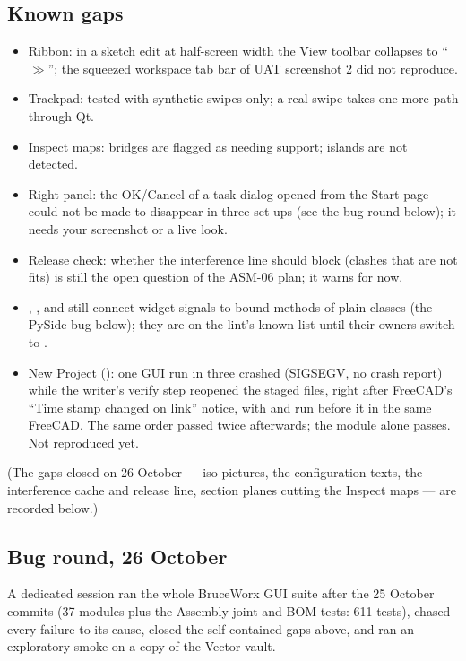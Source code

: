 \subsection{Known gaps}
\begin{itemize}
  \item Ribbon: in a sketch edit at half-screen width the View toolbar collapses to ``$\gg$''; the squeezed
        workspace tab bar of UAT screenshot 2 did not reproduce.
  \item Trackpad: tested with synthetic swipes only; a real swipe takes one more path through Qt.
  \item Inspect maps: bridges are flagged as needing support; islands are not detected.
  \item Right panel: the OK/Cancel of a task dialog opened from the Start page could not be made to disappear
        in three set-ups (see the bug round below); it needs your screenshot or a live look.
  \item Release check: whether the interference line should block (clashes that are not fits) is still the open
        question of the ASM-06 plan; it warns for now.
  \item {}, ,  and
         still connect widget signals to bound methods of plain classes (the PySide
        bug below); they are on the lint's known list until their owners switch to .
  \item New Project (): one GUI run in three crashed (SIGSEGV, no crash report) while the writer's
        verify step reopened the staged files, right after FreeCAD's ``Time stamp changed on link'' notice, with
         and  run before it in the same FreeCAD. The same
        order passed twice afterwards; the module alone passes. Not reproduced yet.
\end{itemize}
(The gaps closed on 26 October --- iso pictures, the configuration texts, the interference cache and release
line, section planes cutting the Inspect maps --- are recorded below.)

\subsection{Bug round, 26 October}

A dedicated session ran the whole BruceWorx GUI suite after the 25 October commits (37 modules plus the
Assembly joint and BOM tests: 611 tests), chased every failure to its cause, closed the self-contained gaps
above, and ran an exploratory smoke on a copy of the Vector vault.

